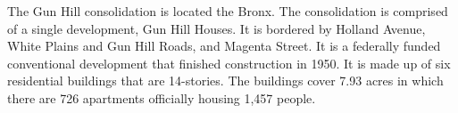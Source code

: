    

  

The Gun Hill consolidation is located the Bronx. The consolidation is comprised of a single development, Gun Hill Houses. It is bordered by Holland Avenue, White Plains and Gun Hill Roads, and Magenta Street.  It is a federally funded conventional development that finished construction in 1950. It is made up of six residential buildings that are 14-stories. The buildings cover 7.93  acres in which there are 726 apartments officially housing 1,457 people.   